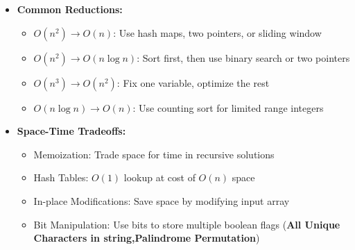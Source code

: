 \documentclass[a4paper,10pt]{book}
\begin{document}
\begin{itemize}[leftmargin=*]
    \item \textbf{Common Reductions:}
    \begin{itemize}
        \item $O(n^2) \rightarrow O(n)$: Use hash maps, two pointers, or sliding window
        \item $O(n^2) \rightarrow O(n \log n)$: Sort first, then use binary search or two pointers
        \item $O(n^3) \rightarrow O(n^2)$: Fix one variable, optimize the rest
        \item $O(n \log n) \rightarrow O(n)$: Use counting sort for limited range integers
    \end{itemize}
    
    \item \textbf{Space-Time Tradeoffs:}
    \begin{itemize}
        \item Memoization: Trade space for time in recursive solutions
        \item Hash Tables: $O(1)$ lookup at cost of $O(n)$ space
        \item In-place Modifications: Save space by modifying input array
        \item Bit Manipulation: Use bits to store multiple boolean flags (\textbf{All Unique Characters in string,Palindrome Permutation})
    \end{itemize}
\end{itemize}
\end{document}
